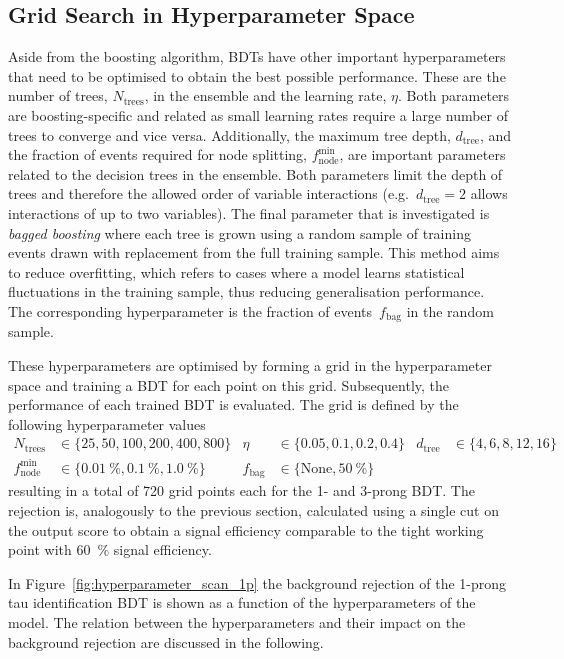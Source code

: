 \subsection{Grid Search in Hyperparameter Space}
\label{sec:bdt_grid_search}

Aside from the boosting algorithm, BDTs have other important hyperparameters
that need to be optimised to obtain the best possible performance. These are the
number of trees, $N_\text{trees}$, in the ensemble and the learning rate,
$\eta$. Both parameters are boosting-specific and related as small learning
rates require a large number of trees to converge and vice versa. Additionally,
the maximum tree depth, $d_\text{tree}$, and the fraction of events required for
node splitting, $f_\text{node}^\text{min}$, are important parameters related to
the decision trees in the ensemble. Both parameters limit the depth of trees and
therefore the allowed order of variable interactions (e.g.\ $d_\text{tree} = 2$
allows interactions of up to two variables). The final parameter that is
investigated is \emph{bagged boosting} where each tree is grown using a random
sample of training events drawn with replacement from the full training sample.
This method aims to reduce overfitting, which refers to cases where a model
learns statistical fluctuations in the training sample, thus reducing
generalisation performance. The corresponding hyperparameter is the fraction of
events~$f_\text{bag}$ in the random sample.

These hyperparameters are optimised by forming a grid in the hyperparameter
space and training a BDT for each point on this grid. Subsequently, the
performance of each trained BDT is evaluated. The grid is defined by the
following hyperparameter values
\begin{align*}
  N_\mathrm{trees} &\in \{25, 50, 100, 200, 400, 800\} & \eta &\in \{0.05, 0.1, 0.2, 0.4\} & d_\mathrm{tree} &\in \{4, 6, 8, 12, 16\}\\
  f_\mathrm{node}^\mathrm{min} &\in \{\SI{0.01}{\percent}, \SI{0.1}{\percent},\SI{1.0}{\percent}\} & f_\text{bag} &\in \{\text{None}, \SI{50}{\percent} \}
\end{align*}
resulting in a total of 720 grid points each for the 1- and 3-prong BDT. The
rejection is, analogously to the previous section, calculated using a single cut
on the output score to obtain a signal efficiency comparable to the tight
working point with \SI{60}{\percent} signal efficiency.

In Figure~\ref{fig:hyperparameter_scan_1p} the background rejection of the
1-prong tau identification BDT is shown as a function of the hyperparameters of
the model. The relation between the hyperparameters and their impact on the
background rejection are discussed in the following.

